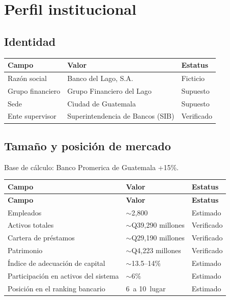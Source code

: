 \documentclass[11pt,a4paper]{article}
\begin{document}
	
	\section{Perfil institucional}
	
	\subsection{Identidad}
	
	\begin{table}[H]
		\centering
		\begin{tabular}{@{}p{4cm}p{6cm}p{3cm}@{}}
			\toprule
			\textbf{Campo} & \textbf{Valor} & \textbf{Estatus} \\ \midrule
			Razón social & Banco del Lago, S.A. & Ficticio \\
			Grupo financiero & Grupo Financiero del Lago & Supuesto \\
			Sede & Ciudad de Guatemala & Supuesto \\
			Ente supervisor & Superintendencia de Bancos (SIB) & Verificado \\ \bottomrule
		\end{tabular}
	\end{table}
	
	\subsection{Tamaño y posición de mercado}
	
	Base de cálculo: Banco Promerica de Guatemala +15\%.
	
	\begin{longtable}{@{}p{6.5cm}p{5cm}p{3.5cm}@{}}
		\toprule
		\textbf{Campo} & \textbf{Valor} & \textbf{Estatus} \\ \midrule
		\endfirsthead
		\toprule
		\textbf{Campo} & \textbf{Valor} & \textbf{Estatus} \\ \midrule
		\endhead
		Empleados & $\sim$2,800 & Estimado \\
		Activos totales & $\sim$Q39,290 millones & Verificado \\
		Cartera de préstamos & $\sim$Q29,190 millones & Verificado \\
		Patrimonio & $\sim$Q4,223 millones & Verificado \\
		Índice de adecuación de capital & $\sim$13.5--14\% & Estimado \\
		Participación en activos del sistema & $\sim$6\% & Estimado \\
		Posición en el ranking bancario & 6\textdegree \, a 10\textdegree \, lugar & Estimado \\ \bottomrule
	\end{longtable}
	
\end{document}
